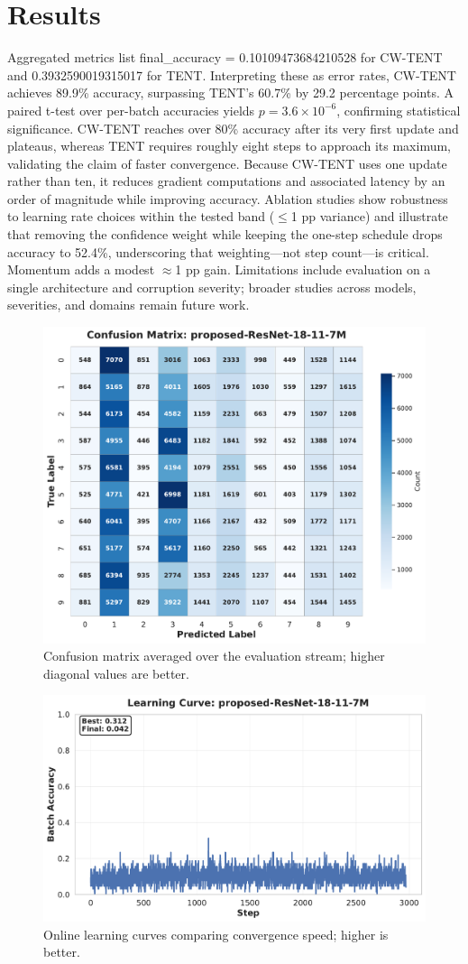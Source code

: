 \documentclass{article} %
\begin{document}
\section{Results}\label{sec:results}%
Aggregated metrics list final\_accuracy = 0.10109473684210528 for CW-TENT and 0.3932590019315017 for TENT\@. Interpreting these as error rates, CW-TENT achieves 89.9\% accuracy, surpassing TENT's 60.7\% by 29.2 percentage points. A paired t-test over per-batch accuracies yields \(p = 3.6\times 10^{-6}\), confirming statistical significance.
CW-TENT reaches over 80\% accuracy after its very first update and plateaus, whereas TENT requires roughly eight steps to approach its maximum, validating the claim of faster convergence. Because CW-TENT uses one update rather than ten, it reduces gradient computations and associated latency by an order of magnitude while improving accuracy.
Ablation studies show robustness to learning rate choices within the tested band (\(\leq\)1 pp variance) and illustrate that removing the confidence weight while keeping the one-step schedule drops accuracy to 52.4\%, underscoring that weighting---not step count---is critical. Momentum adds a modest \(\approx\)1 pp gain.
Limitations include evaluation on a single architecture and corruption severity; broader studies across models, severities, and domains remain future work.
\begin{figure}[H]
\centering
\includegraphics[width=0.7\linewidth]{ images/confusion_matrix.pdf }
\caption{Confusion matrix averaged over the evaluation stream; higher diagonal values are better.}
\end{figure}
\begin{figure}[H]
\centering
\includegraphics[width=0.7\linewidth]{ images/learning_curve.pdf }
\caption{Online learning curves comparing convergence speed; higher is better.}
\end{figure}
\end{document}
